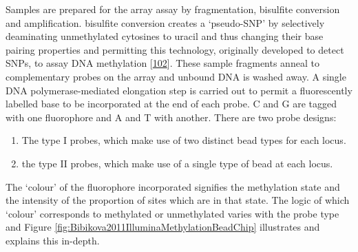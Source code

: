 \documentclass[
]{book}
\providecommand{\tightlist}{%
  \setlength{\itemsep}{0pt}\setlength{\parskip}{0pt}}
\begin{document}
Samples are prepared for the array assay by fragmentation, bisulfite conversion and amplification.
bisulfite conversion creates a `pseudo-SNP' by selectively deaminating unmethylated cytosines to uracil and thus changing their base pairing properties and permitting this technology, originally developed to detect SNPs, to assay DNA methylation {[}\protect\hyperlink{ref-Bibikova2006}{102}{]}.
These sample fragments anneal to complementary probes on the array and unbound DNA is washed away.
A single DNA polymerase-mediated elongation step is carried out to permit a fluorescently labelled base to be incorporated at the end of each probe.
C and G are tagged with one fluorophore and A and T with another.
There are two probe designs:

\begin{enumerate}
\def\labelenumi{\arabic{enumi}.}
\tightlist
\item
  The type I probes, which make use of two distinct bead types for each locus.
\item
  the type II probes, which make use of a single type of bead at each locus.
\end{enumerate}

The `colour' of the fluorophore incorporated signifies the methylation state and the intensity of the proportion of sites which are in that state.
The logic of which `colour' corresponds to methylated or unmethylated varies with the probe type and Figure \ref{fig:Bibikova2011IlluminaMethylationBeadChip} illustrates and explains this in-depth.
\end{document}
